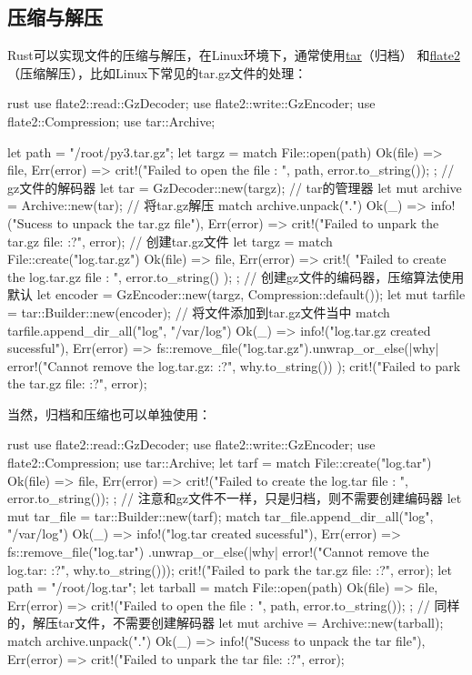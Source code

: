\subsection{压缩与解压}
Rust可以实现文件的压缩与解压，在Linux环境下，通常使用\href{https://github.com/alexcrichton/tar-rs}{tar}（归档）
和\href{https://github.com/rust-lang/flate2-rs}{flate2}（压缩解压），比如Linux下常见的tar.gz文件的处理：
\begin{code-block}{rust}
use flate2::read::GzDecoder;
use flate2::write::GzEncoder;
use flate2::Compression;
use tar::Archive;

let path = "/root/py3.tar.gz";
let targz = match File::open(path) {
    Ok(file) => file,
    Err(error) => {
        crit!("Failed to open the file {}: {}", path, error.to_string());
    }
};
// gz文件的解码器
let tar = GzDecoder::new(targz);
// tar的管理器
let mut archive = Archive::new(tar);
// 将tar.gz解压
match archive.unpack(".") {
    Ok(_) => info!("Sucess to unpack the tar.gz file"),
    Err(error) => {
        crit!("Failed to unpark the tar.gz file: {:?}", error);
    }
}
// 创建tar.gz文件
let targz = match File::create("log.tar.gz") {
    Ok(file) => file,
    Err(error) => {
        crit!(
            "Failed to create the log.tar.gz file : {}",
            error.to_string()
        );
    }
};
// 创建gz文件的编码器，压缩算法使用默认
let encoder = GzEncoder::new(targz, Compression::default());
let mut tarfile = tar::Builder::new(encoder);
// 将文件添加到tar.gz文件当中
match tarfile.append_dir_all("log", "/var/log") {
    Ok(_) => info!("log.tar.gz created sucessful"),
    Err(error) => {
        fs::remove_file("log.tar.gz").unwrap_or_else(|why| {
            error!("Cannot remove the log.tar.gz: {:?}", why.to_string())
        });
        crit!("Failed to park the tar.gz file: {:?}", error);
    }
}
\end{code-block}

当然，归档和压缩也可以单独使用：
\begin{code-block}{rust}
use flate2::read::GzDecoder;
use flate2::write::GzEncoder;
use flate2::Compression;
use tar::Archive;
let tarf = match File::create("log.tar") {
    Ok(file) => file,
    Err(error) => {
        crit!("Failed to create the log.tar file : {}", error.to_string());
    }
};
// 注意和gz文件不一样，只是归档，则不需要创建编码器
let mut tar_file = tar::Builder::new(tarf);
match tar_file.append_dir_all("log", "/var/log") {
    Ok(_) => info!("log.tar created sucessful"),
    Err(error) => {
        fs::remove_file("log.tar")
            .unwrap_or_else(|why| error!("Cannot remove the log.tar: {:?}", why.to_string()));
        crit!("Failed to park the tar.gz file: {:?}", error);
    }
}
let path = "/root/log.tar";
let tarball = match File::open(path) {
    Ok(file) => file,
    Err(error) => {
        crit!("Failed to open the file {}: {}", path, error.to_string());
    }
};
// 同样的，解压tar文件，不需要创建解码器
let mut archive = Archive::new(tarball);
match archive.unpack(".") {
    Ok(_) => info!("Sucess to unpack the tar file"),
    Err(error) => {
        crit!("Failed to unpark the tar file: {:?}", error);
    }
}
\end{code-block}
